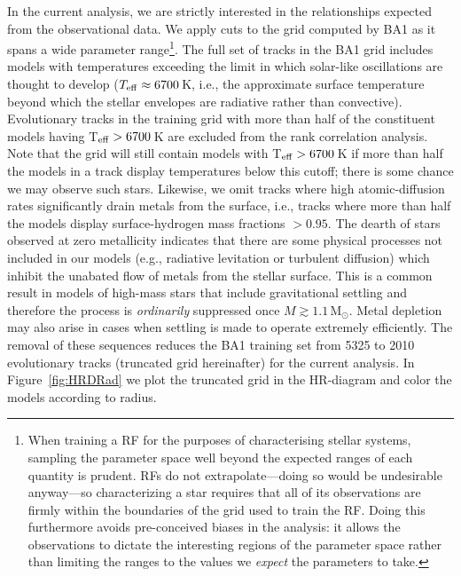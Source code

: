 In the current analysis, we are strictly interested in the relationships expected from the observational data. We apply cuts to the grid computed by BA1 as it spans a wide parameter range\footnote{When training a RF for the purposes of characterising stellar systems,  sampling the parameter space well beyond the expected ranges of each quantity is prudent. RFs do not extrapolate---doing so would be undesirable anyway---so characterizing a star requires that all of its observations are firmly within the boundaries of the grid used to train the RF. Doing this furthermore avoids pre-conceived biases in the analysis: it allows the observations to dictate the interesting regions of the parameter space rather than limiting the ranges to the values we \emph{expect} the parameters to take.}. The full set of tracks in the BA1 grid includes models with temperatures exceeding the limit in which solar-like oscillations are thought to develop ($ T_{\rm{eff}} \approx 6700$\,K, i.e., the approximate surface temperature beyond which the stellar envelopes are radiative rather than convective). 
Evolutionary tracks in the training grid with more than half of the constituent models having T$_{\rm{eff}} > 6700$\,K are excluded from the rank correlation analysis.
Note that the grid will still contain models with T$_{\rm{eff}} > 6700$\,K if more than half the models in a track display temperatures below this cutoff; there is some chance we may observe such stars. 
Likewise, we omit tracks where high atomic-diffusion rates significantly drain metals from the surface, i.e., tracks where more than half the models display surface-hydrogen mass fractions $> 0.95$. The dearth of stars observed at zero metallicity indicates that there are some physical processes not included in our models (e.g., radiative levitation or turbulent diffusion) which inhibit the unabated flow of metals from the stellar surface.
This is a common result in models of high-mass stars that include gravitational settling and therefore the process is \emph{ordinarily} suppressed once  $M \gtrsim 1.1$\,M$_{\odot}$. Metal depletion may also arise in cases when settling is made to operate extremely efficiently. 
The removal of these sequences reduces the BA1 training set from 5325 to 2010 evolutionary tracks (truncated grid hereinafter) for the current analysis. 
In Figure~\ref{fig:HRDRad} we plot the truncated grid in the HR-diagram and color the models according to radius.  



